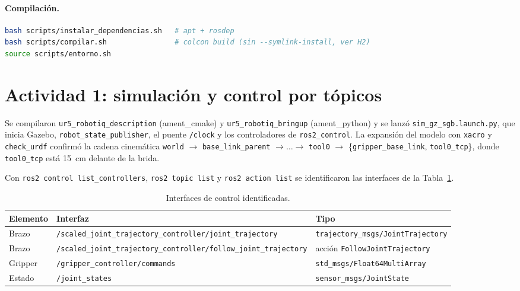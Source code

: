 \documentclass[11pt,letterpaper]{article}
\begin{document}
\paragraph{Compilación.}
\begin{lstlisting}[language=bash]
bash scripts/instalar_dependencias.sh   # apt + rosdep
bash scripts/compilar.sh                # colcon build (sin --symlink-install, ver H2)
source scripts/entorno.sh
\end{lstlisting}

\section{Actividad 1: simulación y control por tópicos}

Se compilaron \texttt{ur5\_robotiq\_description} (ament\_cmake) y \texttt{ur5\_robotiq\_bringup} (ament\_python) y se lanzó \texttt{sim\_gz\_sgb.launch.py}, que inicia Gazebo, \texttt{robot\_state\_publisher}, el puente \texttt{/clock} y los controladores de \texttt{ros2\_control}. La expansión del modelo con \texttt{xacro} y \texttt{check\_urdf} confirmó la cadena cinemática \texttt{world} $\rightarrow$ \texttt{base\_link\_parent} $\rightarrow \dots \rightarrow$ \texttt{tool0} $\rightarrow$ \{\texttt{gripper\_base\_link}, \texttt{tool0\_tcp}\}, donde \texttt{tool0\_tcp} está 15~cm delante de la brida.

Con \texttt{ros2 control list\_controllers}, \texttt{ros2 topic list} y \texttt{ros2 action list} se identificaron las interfaces de la Tabla~\ref{tab:interfaces}.

\begin{table}[H]
\centering
\caption{Interfaces de control identificadas.}
\label{tab:interfaces}
\small
\begin{tabularx}{\linewidth}{@{}l >{\raggedright\arraybackslash}X >{\raggedright\arraybackslash}p{4.6cm}@{}}
\toprule
Elemento & Interfaz & Tipo \\
\midrule
Brazo & \texttt{/scaled\_joint\_trajectory\_controller/\allowbreak joint\_trajectory} & \texttt{trajectory\_msgs/\allowbreak JointTrajectory} \\
Brazo & \texttt{/scaled\_joint\_trajectory\_controller/\allowbreak follow\_joint\_trajectory} & acción \texttt{FollowJointTrajectory} \\
Gripper & \texttt{/gripper\_controller/commands} & \texttt{std\_msgs/\allowbreak Float64MultiArray} \\
Estado & \texttt{/joint\_states} & \texttt{sensor\_msgs/JointState} \\
\bottomrule
\end{tabularx}
\end{table}
\end{document}
